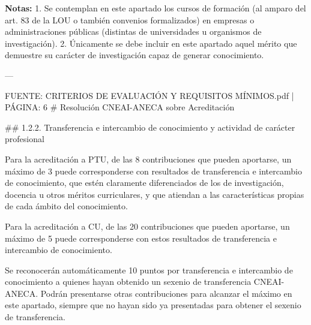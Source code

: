 \documentclass{article}
\begin{document}
\begin{itemize}
\begin{itemize}
\begin{scriptsize}
                  \textbf{Notas:}
                  1. Se contemplan en este apartado los cursos de formación (al amparo del art. 83 de la LOU o también convenios formalizados) en empresas o administraciones públicas (distintas de universidades u organismos de investigación).
                  2. Únicamente se debe incluir en este apartado aquel mérito que demuestre su carácter de investigación capaz de generar conocimiento.

                  ---

                  FUENTE: CRITERIOS DE EVALUACIÓN Y REQUISITOS MÍNIMOS.pdf | PÁGINA: 6
                  \# Resolución CNEAI-ANECA sobre Acreditación

                  \#\# 1.2.2. Transferencia e intercambio de conocimiento y actividad de carácter profesional

                  Para la acreditación a PTU, de las 8 contribuciones que pueden aportarse, un máximo de 3 puede corresponderse con resultados de transferencia e intercambio de conocimiento, que estén claramente diferenciados de los de investigación, docencia u otros méritos curriculares, y que atiendan a las características propias de cada ámbito del conocimiento.

                  Para la acreditación a CU, de las 20 contribuciones que pueden aportarse, un máximo de 5 puede corresponderse con estos resultados de transferencia e intercambio de conocimiento.

                  Se reconocerán automáticamente 10 puntos por transferencia e intercambio de conocimiento a quienes hayan obtenido un sexenio de transferencia CNEAI-ANECA. Podrán presentarse otras contribuciones para alcanzar el máximo en este apartado, siempre que no hayan sido ya presentadas para obtener el sexenio de transferencia.


\end{scriptsize}
\end{itemize}
\end{itemize}
\end{document}
